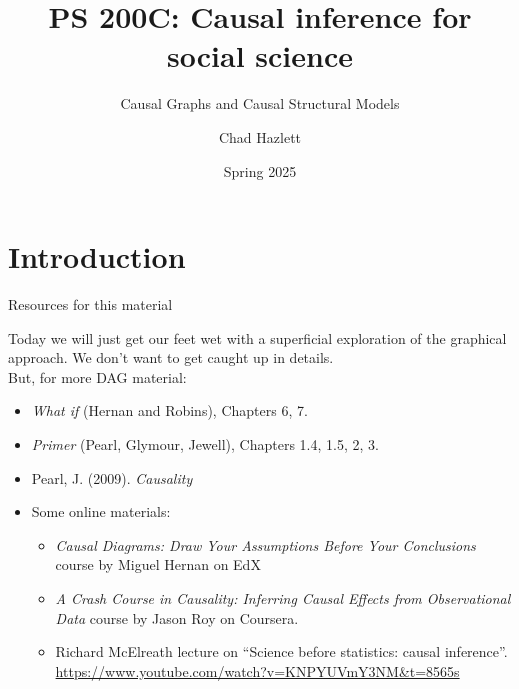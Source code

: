 \documentclass[xcolor=dvipsnames]{beamer}
\title{PS 200C: Causal inference for social science}
\date{Spring 2025}
\subtitle[ ]{Causal Graphs and Causal Structural Models}
\author{Chad Hazlett}
\institute[UCLA]{UCLA\\[1ex]
  \texttt{chazlett@ucla.edu}}
\begin{document}
\subject{Talks}



%

\begin{frame}
  \titlepage
\end{frame}

\section{Introduction}

\begin{frame}{Resources for this material}

 Today we will just get our feet wet with a superficial exploration of the graphical approach. We don't want to get caught up in details. \\
\medskip
{} But, for more DAG material:\\
\bigskip
\begin{itemize}
\small
\item  \textit{What if} (Hernan and Robins), Chapters 6, 7.
\item  \textit{Primer} (Pearl, Glymour, Jewell), Chapters 1.4, 1.5, 2, 3.
\item  Pearl, J. (2009).  \textit{Causality} \\
\item<3-> Some online materials:\\
\begin{itemize}
\footnotesize
\item \textit{Causal Diagrams: Draw Your Assumptions Before Your Conclusions} course by Miguel Hernan on EdX
\item \textit{A Crash Course in Causality: Inferring Causal Effects from Observational Data} course by Jason Roy on Coursera.
\item Richard McElreath lecture on ``Science before statistics: causal inference''. \url{https://www.youtube.com/watch?v=KNPYUVmY3NM&t=8565s}
\end{itemize}
\end{itemize}
\end{frame}
\end{document}
